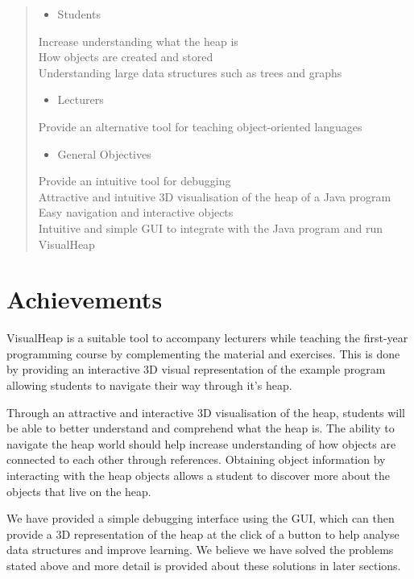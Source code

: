 \documentclass[11pt, a4paper]{report}
\begin{document}
\begin{quote}

\begin{itemize}
  \item Students
\end{itemize}
Increase understanding what the heap is \\
How objects are created and stored \\
Understanding large data structures such as trees and graphs

\begin{itemize}
  \item Lecturers
\end{itemize}
Provide an alternative tool for teaching object-oriented languages

\begin{itemize}
  \item General Objectives
\end{itemize}
Provide an intuitive tool for debugging \\
Attractive and intuitive 3D visualisation of the heap of a Java program \\
Easy navigation and interactive objects \\
Intuitive and simple GUI to integrate with the Java program and run VisualHeap

\end{quote}

\section{Achievements}

VisualHeap is a suitable tool to accompany lecturers while teaching the first-year programming course by complementing the material and exercises. This is done by providing an interactive 3D visual representation of the example program allowing students to navigate their way through it’s heap.

Through an attractive and interactive 3D visualisation of the heap, students will be able to better understand and comprehend what the heap is. The ability to navigate the heap world should help increase understanding of how objects are connected to each other through references. Obtaining object information by interacting with the heap objects allows a student to discover more about the objects that live on the heap.

We have provided a simple debugging interface using the GUI, which can then provide a 3D representation of the heap at the click of a button to help analyse data structures and improve learning. We believe we have solved the problems stated above and more detail is provided about these solutions in later sections.
\end{document}
